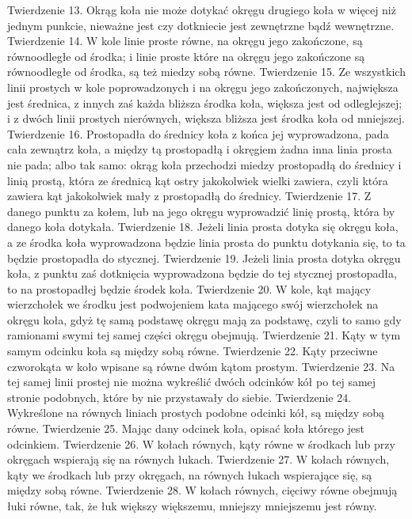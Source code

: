 Twierdzenie 13.
    Okrąg koła nie może dotykać okręgu drugiego koła w więcej niż jednym punkcie, nieważne jest czy dotkniecie jest zewnętrzne bądź wewnętrzne.
Twierdzenie 14.
    W kole linie proste równe, na okręgu jego zakończone, są równoodległe od środka; i linie proste które na okręgu jego zakończone są równoodległe od środka, są też miedzy sobą równe.
Twierdzenie 15.
    Ze wszystkich linii prostych w kole poprowadzonych i na okręgu jego zakończonych, największa jest średnica, z innych zaś każda bliższa środka koła, większa jest od odleglejszej; i z dwóch linii prostych nierównych, większa bliższa jest środka koła od mniejszej.
Twierdzenie 16.
    Prostopadła do średnicy koła z końca jej wyprowadzona, pada cała zewnątrz koła, a między tą prostopadłą i okręgiem żadna inna linia prosta nie pada; albo tak samo: okrąg koła przechodzi miedzy prostopadłą do średnicy i linią prostą, która ze średnicą kąt ostry jakokolwiek wielki zawiera, czyli która zawiera kąt jakokolwiek mały z prostopadłą do średnicy.
Twierdzenie 17.
    Z danego punktu za kołem, lub na jego okręgu wyprowadzić linię prostą, która by danego koła dotykała.
Twierdzenie 18.
    Jeżeli linia prosta dotyka się okręgu koła, a ze środka koła wyprowadzona będzie linia prosta do punktu dotykania się, to ta będzie prostopadła do stycznej.
Twierdzenie 19.
    Jeżeli linia prosta dotyka okręgu koła, z punktu zaś dotknięcia wyprowadzona będzie do tej stycznej prostopadła, to na prostopadłej będzie środek koła.
Twierdzenie 20.
    W kole, kąt mający wierzchołek we środku jest podwojeniem kata mającego swój wierzchołek na okręgu koła, gdyż tę samą podstawę okręgu mają za podstawę, czyli to samo gdy ramionami swymi tej samej części okręgu obejmują.
Twierdzenie 21.
    Kąty w tym samym odcinku koła są między sobą równe.
Twierdzenie 22.
    Kąty przeciwne czworokąta w koło wpisane są równe dwóm kątom prostym.
Twierdzenie 23.
    Na tej samej linii prostej nie można wykreślić dwóch odcinków kół po tej samej stronie podobnych, które by nie przystawały do siebie.
Twierdzenie 24.
    Wykreślone na równych liniach prostych podobne odcinki kół, są między sobą równe.
Twierdzenie 25.
    Mając dany odcinek koła, opisać koła którego jest odcinkiem.
Twierdzenie 26.
    W kołach równych, kąty równe w środkach lub przy okręgach wspierają się na równych łukach.
Twierdzenie 27.
    W kołach równych, kąty we środkach lub przy okręgach, na równych łukach wspierające się, są między sobą równe.
Twierdzenie 28.
    W kołach równych, cięciwy równe obejmują łuki równe, tak, że łuk większy większemu, mniejszy mniejszemu jest równy.
